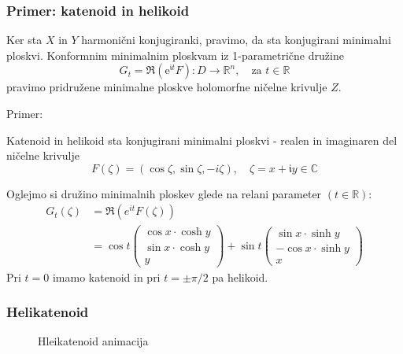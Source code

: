 \documentclass[8pt]{beamer}
\theoremstyle{definition}
\theoremstyle{remark}
\theoremstyle{plain}
\numberwithin{equation}{section}  %
\begin{document}
\begin{frame}
    \frametitle{Primer: katenoid in helikoid}

    Ker sta $X$ in $Y$ harmonični konjugiranki, pravimo, da sta \textcolor{red1}{konjugirani minimalni ploskvi}. Konformnim minimalnim ploskvam iz 1-parametrične družine 
    \begin{equation*}
        G_t=\Re\left(\mathrm{e}^{\mathfrak{i} t} F\right): D \longrightarrow \mathbb{R}^n, \quad \text{za }t \in \mathbb{R}
    \end{equation*}
    pravimo \textcolor{red1}{pridružene minimalne ploskve} holomorfne ničelne krivulje $Z$.
    
    \vspace{0.8em}

    \textcolor{red1}{Primer:}

    Katenoid in helikoid sta konjugirani minimalni ploskvi - realen in imaginaren del ničelne krivulje 
    \begin{equation*}
        F(\zeta)=(\cos \zeta, \sin \zeta,-i \zeta), \quad \zeta=x+\mathfrak{i} y \in \mathbb{C}        
    \end{equation*}

    Oglejmo si družino minimalnih ploskev glede na relani parameter $(t \in \mathbb{R})$:
    \begin{align*}
        G_t(\zeta) & =\Re\left(e^{i t} F(\zeta)\right) \\
        & =\cos t\begin{pmatrix}
        \cos x \cdot \cosh y \\
        \sin x \cdot \cosh y \\
        y
        \end{pmatrix}+\sin t\begin{pmatrix}
        \sin x \cdot \sinh y \\
        -\cos x \cdot \sinh y \\
        x
        \end{pmatrix}
    \end{align*}
    Pri $t=0$ imamo katenoid in pri $t= \pm \pi / 2$ pa helikoid. 

\end{frame}

\begin{frame}
    \frametitle{Helikatenoid}

    \begin{figure}[ht]
        \centering
        \caption{Hleikatenoid animacija}
    \end{figure}
\end{frame}
\end{document}
